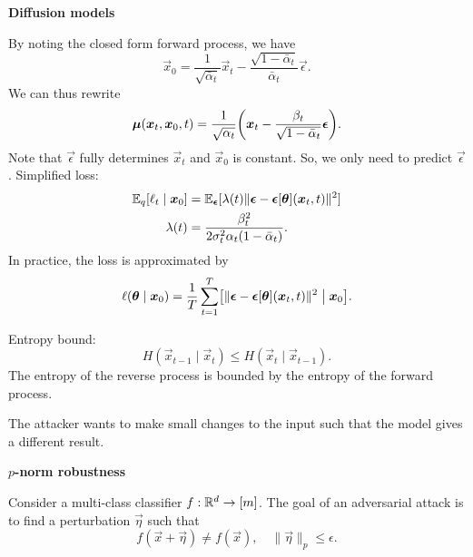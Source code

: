 \documentclass[10pt]{article}
\newenvironment{topic}[1]
{\textbf{\sffamily \colorbox{black}{\rlap{\textbf{\textcolor{white}{#1}}}\hspace{\linewidth}\hspace{-2\fboxsep}}}}
{}
\newenvironment{subtopic}[1]
{\begin{center}\textbf{\sffamily #1}\end{center}}
{}
\begin{document}
\begin{multicols*}{3}
\begin{topic}{Generative models}
\begin{subtopic}{Diffusion models}
            By noting the closed form forward process, we have \[
                \vec{x}_0 = \frac{1}{\sqrt{\bar{\alpha}_t}} \vec{x}_t - \frac{\sqrt{1-\bar{\alpha}_t}}{\bar{\alpha}_t} \vec{\epsilon}.
            \]
            We can thus rewrite \[
                \vec{\mu}(\vec{x}_t, \vec{x}_0, t) = \frac{1}{\sqrt{\alpha_t}} \lft( \vec{x}_t - \frac{\beta_t}{\sqrt{1-\bar{\alpha}_t}} \vec{\epsilon} \rgt).
            \]
            Note that $\vec{\epsilon}$ fully determines $\vec{x}_t$ and $\vec{x}_0$ is constant. So, we only
            need to predict $\vec{\epsilon}$. Simplified loss:
            \begin{align*}
                \mathbb{E}_q[\ell_t \mid \bm{x}_0] & = \mathbb{E}_{\bm{\epsilon}}[\lambda(t) \| \bm{\epsilon} - \bm{\epsilon}[\bm{\theta}](\bm{x}_t, t) \|^2] \\
                \lambda(t) & = \frac{\beta_t^2}{2 \sigma_t^2 \alpha_t (1-\bar{\alpha}_t)}.
            \end{align*}
            In practice, the loss is approximated by \[
                \ell(\vec{\theta} \mid \vec{x}_0) = \frac{1}{T} \sum_{t=1}^{T} \lft[ \| \vec{\epsilon} - \vec{\epsilon}[\vec{\theta}](\vec{x}_t, t) \|^2 \;\middle|\; \vec{x}_0 \rgt].
            \]

            Entropy bound: \[
                H(\vec{x}_{t-1} \mid \vec{x}_t) \leq H(\vec{x}_t \mid \vec{x}_{t-1}).
            \]
            The entropy of the reverse process is bounded by the entropy of the forward process.
        \end{subtopic}

    \end{topic}

    \begin{topic}{Adversarial attacks}

        The attacker wants to make small changes to the input such that the model gives a different result.

        \begin{subtopic}{$p$-norm robustness}
            Consider a multi-class classifier $f: \mathbb{R}^d \to [m]$. The goal of an adversarial attack is to find a perturbation $\vec{\eta}$ such that \[
                f(\vec{x} + \vec{\eta}) \neq f(\vec{x}), \quad \| \vec{\eta} \|_p \leq \epsilon.
            \]


\end{subtopic}
\end{topic}
\end{multicols*}
\end{document}
